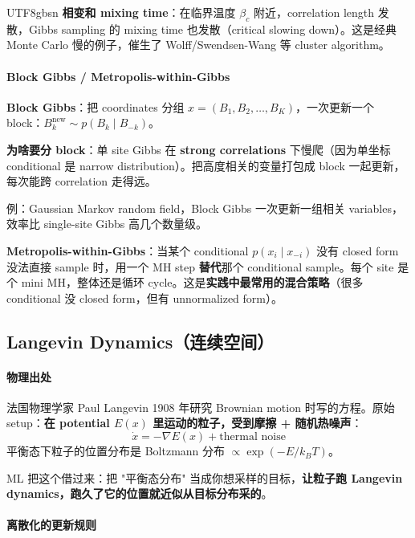 \documentclass[11pt]{article}
\begin{document}
\begin{CJK}{UTF8}{gbsn}
\textbf{相变和 mixing time}：在临界温度 $\beta_c$ 附近，correlation length 发散，Gibbs sampling 的 mixing time 也发散（critical slowing down）。这是经典 Monte Carlo 慢的例子，催生了 Wolff/Swendsen-Wang 等 cluster algorithm。

\paragraph{Block Gibbs / Metropolis-within-Gibbs}

\textbf{Block Gibbs}：把 coordinates 分组 $x = (B_1, B_2, \ldots, B_K)$，一次更新一个 block：$B_k^{\text{new}} \sim p(B_k \mid B_{-k})$。

\textbf{为啥要分 block}：单 site Gibbs 在 \textbf{strong correlations} 下慢爬（因为单坐标 conditional 是 narrow distribution）。把高度相关的变量打包成 block 一起更新，每次能跨 correlation 走得远。

例：Gaussian Markov random field，Block Gibbs 一次更新一组相关 variables，效率比 single-site Gibbs 高几个数量级。

\textbf{Metropolis-within-Gibbs}：当某个 conditional $p(x_i \mid x_{-i})$ 没有 closed form 没法直接 sample 时，用一个 MH step \textbf{替代}那个 conditional sample。每个 site 是个 mini MH，整体还是循环 cycle。这是\textbf{实践中最常用的混合策略}（很多 conditional 没 closed form，但有 unnormalized form）。

\subsection{Langevin Dynamics（连续空间）}

\paragraph{物理出处}

法国物理学家 Paul Langevin 1908 年研究 Brownian motion 时写的方程。原始 setup：\textbf{在 potential $E(x)$ 里运动的粒子，受到摩擦 + 随机热噪声}：
\[
\dot{x} = -\nabla E(x) + \text{thermal noise}
\]
平衡态下粒子的位置分布是 Boltzmann 分布 $\propto \exp(-E / k_B T)$。

ML 把这个借过来：把 "平衡态分布" 当成你想采样的目标，\textbf{让粒子跑 Langevin dynamics，跑久了它的位置就近似从目标分布采的}。

\paragraph{离散化的更新规则}


\end{CJK}
\end{document}
